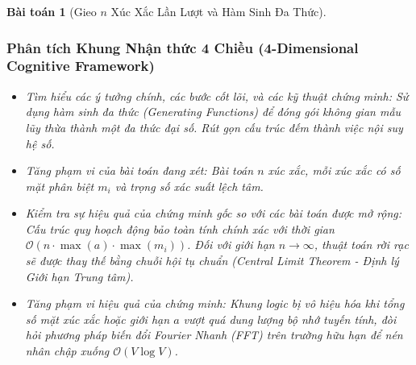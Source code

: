 \documentclass{article}
\newtheorem{baitoan}{Bài toán}
\begin{document}
\begin{baitoan}[Gieo $n$ Xúc Xắc Lần Lượt và Hàm Sinh Đa Thức]
 \subsubsection*{Phân tích Khung Nhận thức 4 Chiều (4-Dimensional Cognitive Framework)}
 \begin{itemize}
 \item \textit{Tìm hiểu các ý tưởng chính, các bước cốt lõi, và các kỹ thuật chứng minh}: Sử dụng hàm sinh đa thức (Generating Functions) để đóng gói không gian mẫu lũy thừa thành một đa thức đại số. Rút gọn cấu trúc đếm thành việc nội suy hệ số.
 \item \textit{Tăng phạm vi của bài toán đang xét}: Bài toán $n$ xúc xắc, mỗi xúc xắc có số mặt phân biệt $m_i$ và trọng số xác suất lệch tâm.
 \item \textit{Kiểm tra sự hiệu quả của chứng minh gốc so với các bài toán được mở rộng}: Cấu trúc quy hoạch động bảo toàn tính chính xác với thời gian $\mathcal{O}(n \cdot \max(a) \cdot \max(m_i))$. Đối với giới hạn $n \to \infty$, thuật toán rời rạc sẽ được thay thế bằng chuỗi hội tụ chuẩn (Central Limit Theorem - Định lý Giới hạn Trung tâm).
 \item \textit{Tăng phạm vi hiệu quả của chứng minh}: Khung logic bị vô hiệu hóa khi tổng số mặt xúc xắc hoặc giới hạn $a$ vượt quá dung lượng bộ nhớ tuyến tính, đòi hỏi phương pháp biến đổi Fourier Nhanh (FFT) trên trường hữu hạn để nén nhân chập xuống $\mathcal{O}(V \log V)$.
 \end{itemize}


\end{baitoan}
\end{document}
